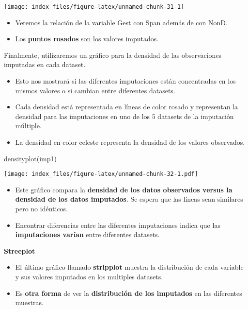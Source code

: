 \documentclass[
]{article}
\newenvironment{Shaded}{\begin{snugshade}}{\end{snugshade}}
\newcommand{\FunctionTok}[1]{\textcolor[rgb]{0.00,0.00,0.00}{#1}}
\newcommand{\NormalTok}[1]{#1}
\begin{document}
\texttt{[image: index\_files/figure-latex/unnamed-chunk-31-1]}

\begin{itemize}
\item
  Veremos la relación de la variable Gest con Span además de con NonD.
\item
  Los \textbf{puntos rosados} son los valores imputados.
\end{itemize}

Finalmente, utilizaremos un gráfico para la densidad de las
observaciones imputadas en cada dataset.

\begin{itemize}
\item
  Esto nos mostrará si las diferentes imputaciones están concentradas en
  los mismos valores o si cambian entre diferentes datasets.
\item
  Cada densidad está representada en líneas de color rosado y
  representan la densidad para las imputaciones en uno de los 5 datasets
  de la imputación múltiple.
\item
  La densidad en color celeste representa la densidad de los valores
  observados.
\end{itemize}

\begin{Shaded}
\begin{Highlighting}[]
\FunctionTok{densityplot}\NormalTok{(imp1)}
\end{Highlighting}
\end{Shaded}

\texttt{[image: index\_files/figure-latex/unnamed-chunk-32-1.pdf]}

\begin{itemize}
\item
  Este gráfico compara la \textbf{densidad de los datos observados
  versus la densidad de los datos imputados}. Se espera que las líneas
  sean similares pero no idénticos.
\item
  Encontrar diferencias entre las diferentes imputaciones indica que las
  \textbf{imputaciones varían} entre diferentes datasets.
\end{itemize}

\textbf{Streeplot}

\begin{itemize}
\item
  El último gráfico llamado \textbf{stripplot} muestra la distribución
  de cada variable y sus valores imputados en los multiples datasets.
\item
  Es \textbf{otra forma} de ver la \textbf{distribución de los
  imputados} en las diferentes muestras.
\end{itemize}
\end{document}
